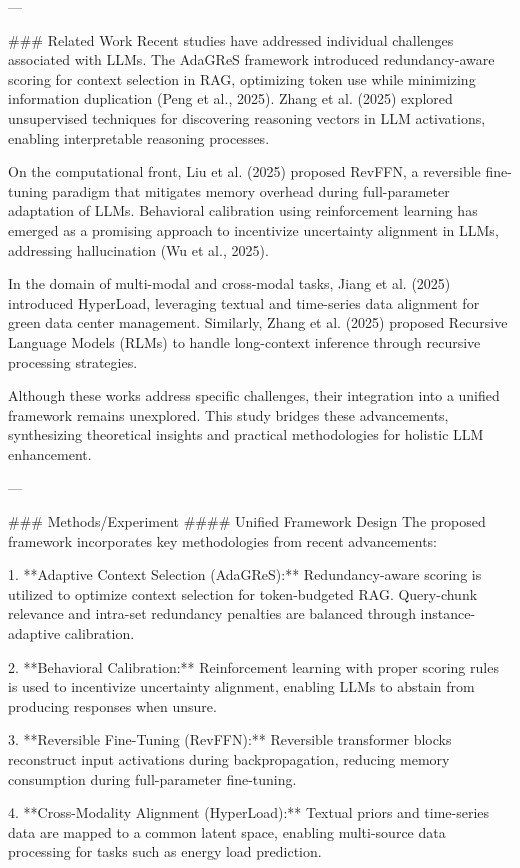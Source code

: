 ---

### Related Work  
Recent studies have addressed individual challenges associated with LLMs. The AdaGReS framework introduced redundancy-aware scoring for context selection in RAG, optimizing token use while minimizing information duplication (Peng et al., 2025). Zhang et al. (2025) explored unsupervised techniques for discovering reasoning vectors in LLM activations, enabling interpretable reasoning processes.

On the computational front, Liu et al. (2025) proposed RevFFN, a reversible fine-tuning paradigm that mitigates memory overhead during full-parameter adaptation of LLMs. Behavioral calibration using reinforcement learning has emerged as a promising approach to incentivize uncertainty alignment in LLMs, addressing hallucination (Wu et al., 2025).

In the domain of multi-modal and cross-modal tasks, Jiang et al. (2025) introduced HyperLoad, leveraging textual and time-series data alignment for green data center management. Similarly, Zhang et al. (2025) proposed Recursive Language Models (RLMs) to handle long-context inference through recursive processing strategies.

Although these works address specific challenges, their integration into a unified framework remains unexplored. This study bridges these advancements, synthesizing theoretical insights and practical methodologies for holistic LLM enhancement.

---

### Methods/Experiment  
#### Unified Framework Design  
The proposed framework incorporates key methodologies from recent advancements:  

1. **Adaptive Context Selection (AdaGReS):**  
   Redundancy-aware scoring is utilized to optimize context selection for token-budgeted RAG. Query-chunk relevance and intra-set redundancy penalties are balanced through instance-adaptive calibration.  

2. **Behavioral Calibration:**  
   Reinforcement learning with proper scoring rules is used to incentivize uncertainty alignment, enabling LLMs to abstain from producing responses when unsure.  

3. **Reversible Fine-Tuning (RevFFN):**  
   Reversible transformer blocks reconstruct input activations during backpropagation, reducing memory consumption during full-parameter fine-tuning.  

4. **Cross-Modality Alignment (HyperLoad):**  
   Textual priors and time-series data are mapped to a common latent space, enabling multi-source data processing for tasks such as energy load prediction.  

